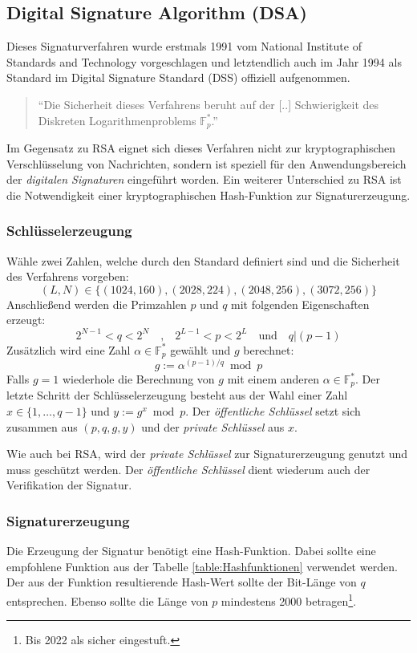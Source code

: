 \documentclass[11pt,a4paper,ngerman]{scrreprt}
\begin{document}
\subsection{Digital Signature Algorithm (DSA)}
Dieses Signaturverfahren wurde erstmals 1991 vom National Institute of Standards and Technology vorgeschlagen und letztendlich auch im Jahr 1994 als Standard im Digital Signature Standard (DSS) offiziell aufgenommen.
\begin{quote}
    ``Die Sicherheit dieses Verfahrens beruht auf der [..] Schwierigkeit des Diskreten Logarithmenproblems $\mathbb{F}^*_p$.'' \cite[S. 45]{bsi-tr-02102-1}
\end{quote}
Im Gegensatz zu RSA eignet sich dieses Verfahren nicht zur kryptographischen Verschlüsselung von Nachrichten, sondern ist speziell für den Anwendungsbereich der \textit{digitalen Signaturen} eingeführt worden. Ein weiterer Unterschied zu RSA ist die Notwendigkeit einer kryptographischen Hash-Funktion zur Signaturerzeugung.
\subsubsection{Schlüsselerzeugung}
Wähle zwei Zahlen, welche durch den Standard definiert sind und die Sicherheit des Verfahrens vorgeben:
\[
    (L, N) \in \{(1024, 160), (2028, 224), (2048, 256), (3072, 256)\}
\]
Anschließend werden die Primzahlen $p$ und $q$ mit folgenden Eigenschaften erzeugt:
\[
    2^{N-1} < q < 2^N \quad\textrm{,}\quad 2^{L-1} < p < 2^L \quad\textrm{und}\quad q|(p-1)
\]
Zusätzlich wird eine Zahl $\alpha \in \mathbb{F}^*_p$ gewählt und $g$ berechnet:
\[
    g := \alpha^{(p-1)/q} \bmod p
\]
Falls $g = 1$ wiederhole die Berechnung von $g$ mit einem anderen $\alpha \in \mathbb{F}^*_p$. Der letzte Schritt der Schlüsselerzeugung besteht aus der Wahl einer Zahl $x \in \{1, \ldots, q - 1 \}$ und $y := g^x \bmod p$. Der \emph{öffentliche Schlüssel} setzt sich zusammen aus $(p, q, g, y)$ und der \emph{private Schlüssel} aus $x$.

Wie auch bei RSA, wird der \emph{private Schlüssel} zur Signaturerzeugung genutzt und muss geschützt werden. Der \emph{öffentliche Schlüssel} dient wiederum auch der Verifikation der Signatur.
\subsubsection{Signaturerzeugung}
Die Erzeugung der Signatur benötigt eine Hash-Funktion. Dabei sollte eine empfohlene Funktion aus der Tabelle \ref{table:Hashfunktionen} verwendet werden. Der aus der Funktion resultierende Hash-Wert sollte der Bit-Länge von $q$ entsprechen. Ebenso sollte die Länge von $p$ mindestens 2000 betragen\footnote{Bis 2022 als sicher eingestuft.\cite{bsi-tr-02102-1}}.
\end{document}
